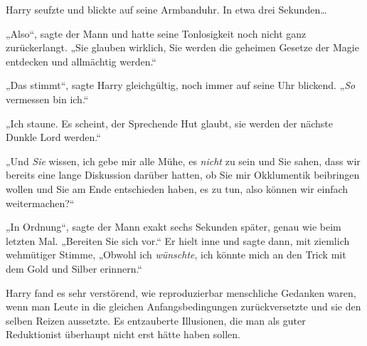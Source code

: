 Harry seufzte und blickte auf seine Armbanduhr. In etwa drei Sekunden…

„Also“, sagte der Mann und hatte seine Tonlosigkeit noch nicht ganz zurückerlangt. „Sie glauben wirklich, Sie werden die geheimen Gesetze der Magie entdecken und allmächtig werden.“

„Das stimmt“, sagte Harry gleichgültig, noch immer auf seine Uhr blickend. „\emph{So} vermessen bin ich.“

„Ich staune. Es scheint, der Sprechende Hut glaubt, sie werden der nächste Dunkle Lord werden.“

„Und \emph{Sie} wissen, ich gebe mir alle Mühe, es \emph{nicht} zu sein und Sie sahen, dass wir bereits eine lange Diskussion darüber hatten, ob Sie mir Okklumentik beibringen wollen und Sie am Ende entschieden haben, es zu tun, also können wir einfach weitermachen?“

„In Ordnung“, sagte der Mann exakt sechs Sekunden später, genau wie beim letzten Mal. „Bereiten Sie sich vor.“ Er hielt inne und sagte dann, mit ziemlich wehmütiger Stimme, „Obwohl ich \emph{wünschte}, ich könnte mich an den Trick mit dem Gold und Silber erinnern.“

Harry fand es sehr verstörend, wie reproduzierbar menschliche Gedanken waren, wenn man Leute in die gleichen Anfangsbedingungen zurückversetzte und sie den selben Reizen aussetzte. Es entzauberte Illusionen, die man als guter Reduktionist überhaupt nicht erst hätte haben sollen.


